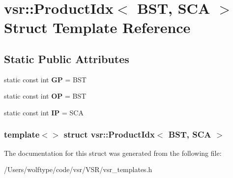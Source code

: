 \hypertarget{structvsr_1_1_product_idx_3_01_b_s_t_00_01_s_c_a_01_4}{\section{vsr\-:\-:Product\-Idx$<$ B\-S\-T, S\-C\-A $>$ Struct Template Reference}
\label{structvsr_1_1_product_idx_3_01_b_s_t_00_01_s_c_a_01_4}
}
\subsection*{Static Public Attributes}
\begin{DoxyCompactItemize}
\item 
\hypertarget{structvsr_1_1_product_idx_3_01_b_s_t_00_01_s_c_a_01_4_a6fcb1fed1bb46399ae35365fb4f95144}{static const int {\bfseries G\-P} = B\-S\-T}\label{structvsr_1_1_product_idx_3_01_b_s_t_00_01_s_c_a_01_4_a6fcb1fed1bb46399ae35365fb4f95144}

\item 
\hypertarget{structvsr_1_1_product_idx_3_01_b_s_t_00_01_s_c_a_01_4_a9ee0144372e8c8ce939e959029e4fad8}{static const int {\bfseries O\-P} = B\-S\-T}\label{structvsr_1_1_product_idx_3_01_b_s_t_00_01_s_c_a_01_4_a9ee0144372e8c8ce939e959029e4fad8}

\item 
\hypertarget{structvsr_1_1_product_idx_3_01_b_s_t_00_01_s_c_a_01_4_a2e2869193cc7e760f9e36446f81f990d}{static const int {\bfseries I\-P} = S\-C\-A}\label{structvsr_1_1_product_idx_3_01_b_s_t_00_01_s_c_a_01_4_a2e2869193cc7e760f9e36446f81f990d}

\end{DoxyCompactItemize}
\subsubsection*{template$<$$>$ struct vsr\-::\-Product\-Idx$<$ B\-S\-T, S\-C\-A $>$}



The documentation for this struct was generated from the following file\-:\begin{DoxyCompactItemize}
\item 
/\-Users/wolftype/code/vsr/\-V\-S\-R/vsr\-\_\-templates.\-h\end{DoxyCompactItemize}
